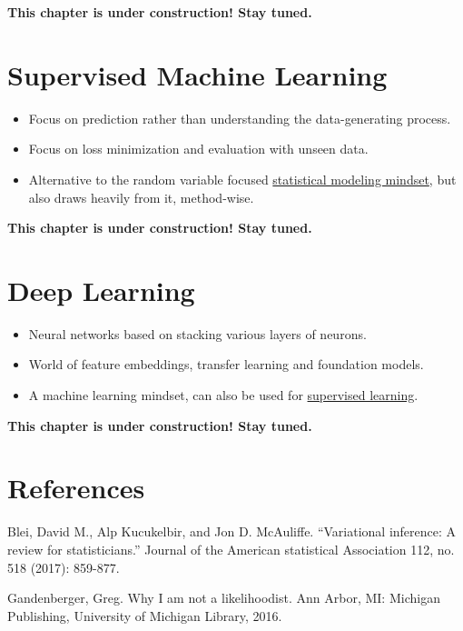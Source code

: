 \documentclass[
  10pt,
]{scrbook}
\providecommand{\tightlist}{%
  \setlength{\itemsep}{0pt}\setlength{\parskip}{0pt}}
\begin{document}
\textbf{This chapter is under construction! Stay tuned.}

\hypertarget{supervised-ml}{%
\chapter{Supervised Machine Learning}\label{supervised-ml}}

\begin{itemize}
\tightlist
\item
  Focus on prediction rather than understanding the data-generating process.
\item
  Focus on loss minimization and evaluation with unseen data.
\item
  Alternative to the random variable focused \protect\hyperlink{statistical-modeling}{statistical modeling mindset}, but also draws heavily from it, method-wise.
\end{itemize}

\textbf{This chapter is under construction! Stay tuned.}

\hypertarget{deep-learning}{%
\chapter{Deep Learning}\label{deep-learning}}

\begin{itemize}
\tightlist
\item
  Neural networks based on stacking various layers of neurons.
\item
  World of feature embeddings, transfer learning and foundation models.
\item
  A machine learning mindset, can also be used for \protect\hyperlink{supervised-ml}{supervised learning}.
\end{itemize}

\textbf{This chapter is under construction! Stay tuned.}

\hypertarget{references}{%
\chapter*{References}\label{references}}


Blei, David M., Alp Kucukelbir, and Jon D. McAuliffe. ``Variational inference: A review for statisticians.'' Journal of the American statistical Association 112, no. 518 (2017): 859-877.

Gandenberger, Greg. Why I am not a likelihoodist. Ann Arbor, MI: Michigan Publishing, University of Michigan Library, 2016.
\end{document}
